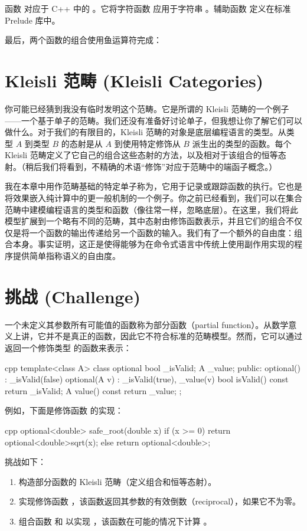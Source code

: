 函数  对应于 C++ 中的 。它将字符函数  应用于字符串 。辅助函数  定义在标准 Prelude 库中。

最后，两个函数的组合使用鱼运算符完成：


\section{Kleisli 范畴 (Kleisli Categories)}

你可能已经猜到我没有临时发明这个范畴。它是所谓的 Kleisli 范畴的一个例子——一个基于单子的范畴。我们还没有准备好讨论单子，但我想让你了解它们可以做什么。对于我们的有限目的，Kleisli 范畴的对象是底层编程语言的类型。从类型 $A$ 到类型 $B$ 的态射是从 $A$ 到使用特定修饰从 $B$ 派生出的类型的函数。每个 Kleisli 范畴定义了它自己的组合这些态射的方法，以及相对于该组合的恒等态射。（稍后我们将看到，不精确的术语“修饰”对应于范畴中的端函子概念。）

我在本章中用作范畴基础的特定单子称为，它用于记录或跟踪函数的执行。它也是将效果嵌入纯计算中的更一般机制的一个例子。你之前已经看到，我们可以在集合范畴中建模编程语言的类型和函数（像往常一样，忽略底层）。在这里，我们将此模型扩展到一个略有不同的范畴，其中态射由修饰函数表示，并且它们的组合不仅仅是将一个函数的输出传递给另一个函数的输入。我们有了一个额外的自由度：组合本身。事实证明，这正是使得能够为在命令式语言中传统上使用副作用实现的程序提供简单指称语义的自由度。

\section{挑战 (Challenge)}

一个未定义其参数所有可能值的函数称为部分函数（partial function）。从数学意义上讲，它并不是真正的函数，因此它不符合标准的范畴模型。然而，它可以通过返回一个修饰类型  的函数来表示：

\begin{snip}{cpp}
  template<class A> class optional {
    bool _isValid;
    A _value;
    public:
    optional()    : _isValid(false) {}
    optional(A v) : _isValid(true), _value(v) {}
    bool isValid() const { return _isValid; }
    A value() const { return _value; }
  };
\end{snip}
例如，下面是修饰函数  的实现：

\begin{snip}{cpp}
  optional<double> safe_root(double x) {
    if (x >= 0) return optional<double>{sqrt(x)};
    else return optional<double>{};
  }
\end{snip}
挑战如下：

\begin{enumerate}
  \tightlist
  \item
  构造部分函数的 Kleisli 范畴（定义组合和恒等态射）。
  \item
  实现修饰函数 ，该函数返回其参数的有效倒数（reciprocal），如果它不为零。
  \item
  组合函数  和  以实现 ，该函数在可能的情况下计算 。
\end{enumerate}
